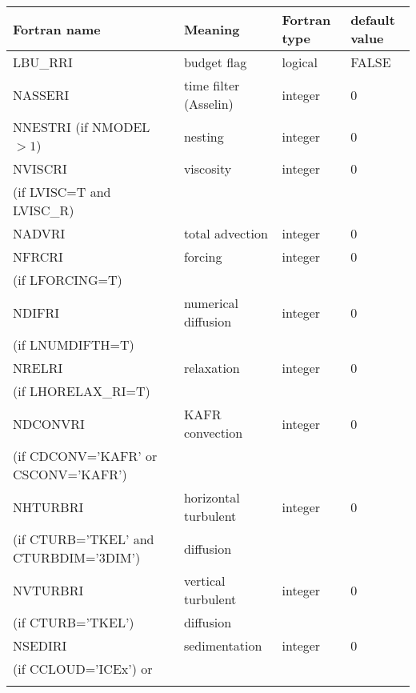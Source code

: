 \begin{longtable} {|p{}|p{}|>{\centering}p{}|p{}<{\centering}|}
\hline
Fortran name & Meaning & Fortran type & default value \\
\hline \hline
\endhead
LBU\_RRI & budget flag & logical & FALSE\index{LBU\_RRI!\innam{NAM\_BU\_RRI}} \\\hline
NASSERI  & time filter (Asselin)   & integer  &  0 \index{NASSERI!\innam{NAM\_BU\_RRI}} \\\hline
NNESTRI (if NMODEL$>1$) & nesting           & integer  &  0 \index{NNESTRI!\innam{NAM\_BU\_RRI}} \\\hline
NVISCRI  & viscosity         & integer  &  0 \index{NVISCRI!\innam{NAM\_BU\_RRI}}\\
(if LVISC=T and LVISC\_R) &  &   &   \\\hline
NADVRI   & total advection   & integer  &  0 \index{NADVRI!\innam{NAM\_BU\_RRI}}\\\hline
NFRCRI   & forcing           & integer  &  0 \index{NFRCRI!\innam{NAM\_BU\_RRI}} \\ \nopagebreak
(if LFORCING=T) &  &   &   \\\hline
NDIFRI   & numerical diffusion & integer  &  0 \index{NDIFRI!\innam{NAM\_BU\_RRI}} \\ \nopagebreak
(if LNUMDIFTH=T) &  &   &   \\\hline
NRELRI   & relaxation        & integer  &  0 \index{NRELRI!\innam{NAM\_BU\_RRI}}\\ \nopagebreak
(if LHORELAX\_RI=T) &  &   &   \\\hline
NDCONVRI & KAFR convection   & integer  &  0 \index{NDCONVRI!\innam{NAM\_BU\_RRI}} \\ \nopagebreak
(if CDCONV='KAFR' or CSCONV='KAFR') &  &   &   \\\hline
NHTURBRI & horizontal turbulent  & integer  &  0 \index{NHTURBRI!\innam{NAM\_BU\_RRI}}\\ \nopagebreak
(if CTURB='TKEL' and CTURBDIM='3DIM') &diffusion &   &  \\\hline
NVTURBRI & vertical turbulent  & integer  &  0 \index{NVTURBRI!\innam{NAM\_BU\_RRI}}\\ \nopagebreak
(if CTURB='TKEL') &diffusion &   &  \\\hline
NSEDIRI  & sedimentation  & integer  &  0 \index{NSEDIRI!\innam{NAM\_BU\_RRI}}\\ \nopagebreak
(if CCLOUD='ICEx') or & &   &  \\ \nopagebreak

\end{longtable}

